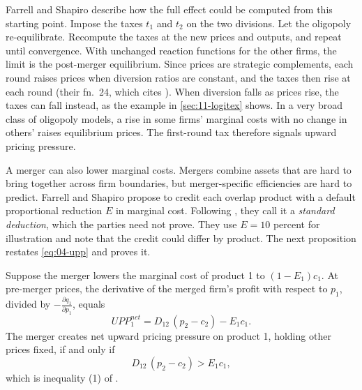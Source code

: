 Farrell and Shapiro describe how the full effect could be computed from this starting point. Impose the taxes $t_1$
and $t_2$ on the two divisions. Let the oligopoly re-equilibrate. Recompute the taxes at the new prices and outputs,
and repeat until convergence. With unchanged reaction functions for the other firms, the limit is the post-merger
equilibrium. Since prices are strategic complements, each round raises prices when diversion ratios are constant,
and the taxes then rise at each round (their fn.~24, which cites \citealp{Echenique2002}). When diversion falls as
prices rise, the taxes can fall instead, as the example in \cref{sec:11-logitex} shows. In a very broad class of oligopoly models, a rise in some firms' marginal costs with no
change in others' raises equilibrium prices. The first-round tax therefore signals upward pricing pressure.

 A merger can also lower marginal costs. Mergers combine assets that
are hard to bring together across firm boundaries, but merger-specific efficiencies are hard to predict. Farrell and
Shapiro propose to credit each overlap product with a default proportional reduction $E$ in marginal cost. Following
\citet{WarrenBoulton1985}, they call it a \emph{standard deduction}, which the parties need not prove. They use
$E = 10$ percent for illustration and note that the credit could differ by product. The next proposition restates
\eqref{eq:04-upp} and proves it.

\begin{proposition}\label{prop:11-netupp}
Suppose the merger lowers the marginal cost of product 1 to $(1 - E_1)c_1$. At pre-merger prices, the derivative of
the merged firm's profit with respect to $p_1$, divided by $-\frac{\partial q_1}{\partial p_1}$, equals
\begin{equation}\label{eq:11-netupp}
  \mathit{UPP}_1^{net} = D_{12}\,(p_2 - c_2) - E_1 c_1 .
\end{equation}
The merger creates net upward pricing pressure on product 1, holding other prices fixed, if and only if
\begin{equation}\label{eq:11-fs1}
  D_{12}\,(p_2 - c_2) > E_1 c_1 ,
\end{equation}
which is inequality (1) of \citet{FarrellShapiro2010}.
\end{proposition}

